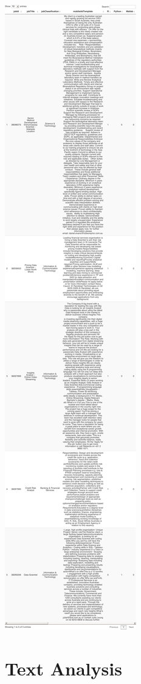 \documentclass[
  letterpaper,
  DIV=11,
  numbers=noendperiod]{scrreport}
\begin{document}
\includegraphics{./03_2-kaggle_files/figure-pdf/employerdf-1.pdf}

\part{Text Analysis}
\end{document}
